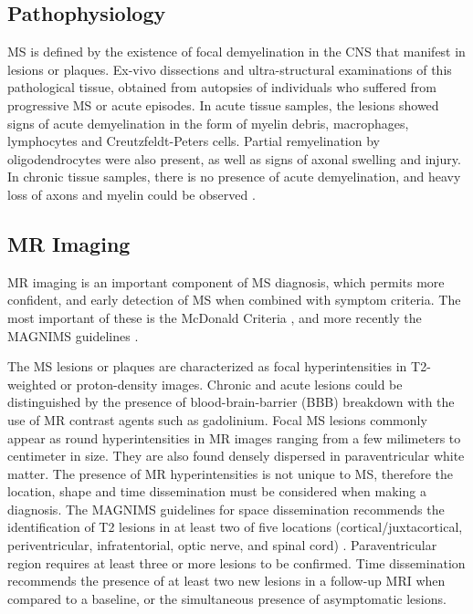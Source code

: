 \subsection{Pathophysiology}

MS is defined by the existence of focal demyelination in the CNS that manifest in lesions or plaques. Ex-vivo dissections and ultra-structural examinations of this pathological tissue, obtained from autopsies of individuals who suffered from progressive MS or acute episodes. In acute tissue samples, the lesions showed signs of acute demyelination in the form of myelin debris, macrophages, lymphocytes and Creutzfeldt-Peters cells. Partial remyelination by oligodendrocytes were also present, as well as signs of axonal swelling and injury. In chronic tissue samples, there is no presence of acute demyelination, and heavy loss of axons and myelin could be observed \cite{Filippi2012}. 

\subsection{MR Imaging}

MR imaging is an important component of MS diagnosis, which permits more confident, and early detection of MS when combined with symptom criteria. The most important of these is the McDonald Criteria \cite{Polman2011}, and more recently the MAGNIMS guidelines \cite{Filippi2016}. 

The MS lesions or plaques are characterized as focal hyperintensities in T2-weighted or proton-density images. Chronic and acute lesions could be distinguished by the presence of blood-brain-barrier (BBB) breakdown with the use of MR contrast agents such as gadolinium. Focal MS lesions commonly appear as round hyperintensities in MR images ranging from a few milimeters to centimeter in size. They are also found densely dispersed in paraventricular white matter. The presence of MR hyperintensities is not unique to MS, therefore the location, shape and time dissemination must be considered when making a diagnosis. The MAGNIMS guidelines for space dissemination recommends the identification of T2 lesions in at least two of five locations (cortical/juxtacortical, periventricular, infratentorial, optic nerve, and spinal cord) \cite{Filippi2016}. Paraventricular region requires at least three or more lesions to be confirmed. Time dissemination recommends the presence of at least two new lesions in a follow-up MRI when compared to a baseline, or the simultaneous presence of asymptomatic lesions. 

